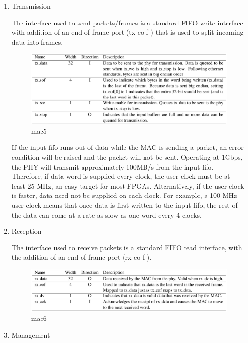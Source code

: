\begin{enumerate}
\item Transmission

The interface used to send packets/frames is a standard FIFO write interface with addition of an end-of-frame port (tx eo f ) that is used to split incoming data into frames.

\begin{figure}[ht!]
\centering
\includegraphics[scale=0.25]{eps/mac5.eps}
\caption{mac5}
\label{mac5}
\end{figure}


If the input fifo runs out of data while the MAC is sending a packet, an error condition will be raised and the packet will not be sent. Operating at 1Gbps, the PHY will transmit approximately 100MB/s from the input fifo. Therefore, if data word is supplied every clock, the user clock must be at least 25 MHz, an easy target for most FPGAs. Alternatively, if the user clock is faster, data need not be supplied on each clock. For example, a 100 MHz user clock means that once data is first written to the input fifo, the rest of the data can come at a rate as slow as one word every 4 clocks.


\item Reception

The interface used to receive packets is a standard FIFO read interface, with the addition of an end-of-frame port (rx eo f ).

\begin{figure}[ht!]
\centering
\includegraphics[scale=0.25]{eps/mac6.eps}
\caption{mac6}
\label{mac6}
\end{figure}

\item Management


\end{enumerate}

